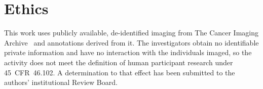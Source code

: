 \documentclass[aapm,mph,amsmath,amssymb,reprint,linenumbers]{revtex4-2}
\begin{document}
\section*{Ethics}
This work uses publicly available, de-identified imaging from The Cancer Imaging
Archive~\cite{tcia,colonog} and annotations derived from it. The investigators obtain no
identifiable private information and have no interaction with the individuals imaged, so the
activity does not meet the definition of human participant research under 45~CFR~46.102. A
determination to that effect has been submitted to the authors' institutional
Review Board.
\end{document}

